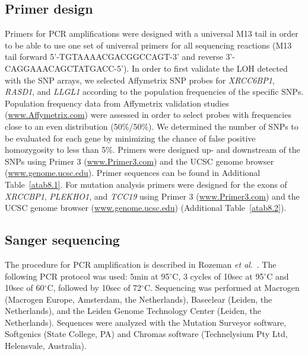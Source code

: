 \subsection{Primer design}
Primers for PCR amplifications were designed with a universal M13 tail in order to be able to use one set of universal primers for all sequencing reactions (M13 tail forward 5'-TGTAAAACGACGGCCAGT-3' and reverse 3'-CAGGAAACAGCTATGACC-5'). In order to first validate the LOH detected with the SNP arrays, we selected Affymetrix SNP probes for {\it XRCC6BP1}, {\it RASD1}, and {\it LLGL1} according to the population frequencies of the specific SNPs. Population frequency data from Affymetrix validation studies (\url{www.Affymetrix.com}) were assessed in order to select probes with frequencies close to an even distribution (50\%/50\%). We determined the number of SNPs to be evaluated for each gene by minimizing the chance of false positive homozygosity to less than 5\%. Primers were designed up- and downstream of the SNPs using Primer 3 (\url{www.Primer3.com}) and the UCSC genome browser (\url{www.genome.ucsc.edu}). Primer sequences can be found in Additional Table~\ref{atab8.1}. For mutation analysis primers were designed for the exons of {\it XRCCBP1}, {\it PLEKHO1}, and {\it TCC19} using Primer 3 (\url{www.Primer3.com}) and the UCSC genome browser (\url{www.genome.ucsc.edu}) (Additional Table~\ref{atab8.2}).

\subsection{Sanger sequencing}
The procedure for PCR amplification is described in Rozeman {\it et al}.~\cite{rozeman2005absence}. The following PCR protocol was used: 5min at 95$^\circ$C, 3 cycles of 10sec at 95$^\circ$C and 10sec of 60$^\circ$C, followed by 10sec of 72$^\circ$C. Sequencing was performed at Macrogen (Macrogen Europe, Amsterdam, the Netherlands), Baseclear (Leiden, the Netherlands), and the Leiden Genome Technology Center (Leiden, the Netherlands). Sequences were analyzed with the Mutation Surveyor software, Softgenics (State College, PA) and Chromas software (Technelysium Pty Ltd, Helensvale, Australia).

